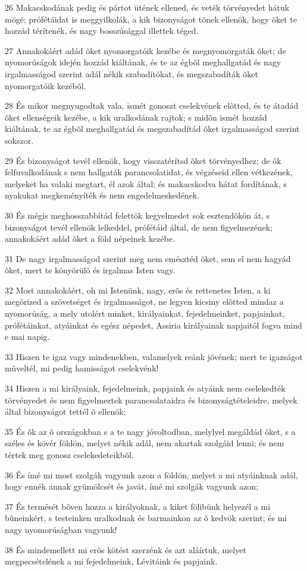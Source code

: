 \par 26 Makacskodának pedig és pártot ütének ellened, és veték törvényedet hátuk mögé; prófétáidat is meggyilkolák, a kik bizonyságot tõnek ellenök, hogy õket te hozzád térítenék, és nagy bosszúsággal illettek téged.
\par 27 Annakokáért adád õket nyomorgatóik kezébe és megnyomorgaták õket; de nyomorúságok idején hozzád kiáltának, és te az égbõl meghallgatád és nagy irgalmasságod szerint adál nékik szabadítókat, és megszabadíták õket nyomorgatóik kezébõl.
\par 28 És mikor megnyugodtak vala, ismét gonoszt cselekvének elõtted, és te átadád õket ellenségeik kezébe, a kik uralkodának rajtok; s midõn ismét hozzád kiáltának, te az égbõl meghallgatád és megszabadítád õket irgalmasságod szerint sokszor.
\par 29 És bizonyságot tevél ellenök, hogy visszatérítsd õket törvényedhez; de õk felfuvalkodának s nem hallgaták parancsolatidat, és végzéseid ellen vétkezének, melyeket ha valaki megtart, él azok által; és makacskodva hátat fordítának, s nyakukat megkeményíték és nem engedelmeskedének.
\par 30 És mégis meghosszabbítád felettök kegyelmedet sok esztendõkön át, s bizonyságot tevél ellenök lelkeddel, prófétáid által, de nem figyelmezének; annakokáért adád õket a föld népeinek kezébe.
\par 31 De nagy irgalmasságod szerint meg nem emésztéd õket, sem el nem hagyád õket, mert te könyörülõ és irgalmas Isten vagy.
\par 32 Most annakokáért, oh mi Istenünk, nagy, erõs és rettenetes Isten, a ki megõrized a szövetséget és irgalmasságot, ne legyen kicsiny elõtted mindaz a nyomorúság, a mely utolért minket, királyainkat, fejedelmeinket, papjainkat, prófétáinkat, atyáinkat és egész népedet, Assiria királyainak napjaitól fogva mind e mai napig.
\par 33 Hiszen te igaz vagy mindenekben, valamelyek reánk jövének; mert te igazságot mûveltél, mi pedig hamisságot cselekvénk!
\par 34 Hiszen a mi királyaink, fejedelmeink, papjaink és atyáink nem cselekedték törvényedet és nem figyelmeztek parancsolataidra és bizonyságtételeidre, melyek által bizonyságot tettél õ ellenök;
\par 35 És õk az õ országokban s a te nagy jóvoltodban, melylyel megáldád õket, s a széles és kövér földön, melyet nékik adál, nem akartak szolgáid lenni; és nem tértek meg gonosz cselekedeteikbõl.
\par 36 És ímé mi most szolgák vagyunk azon a földön, melyet a mi atyáinknak adál, hogy ennék annak gyümölcsét és javát, ímé mi szolgák vagyunk azon;
\par 37 És termését bõven hozza a királyoknak, a kiket fölibünk helyezél a mi bûneinkért, s testeinken uralkodnak és barmainkon az õ kedvök szerint; és mi nagy nyomorúságban vagyunk!
\par 38 És mindemellett mi erõs kötést szerzénk és azt aláírtuk, melyet megpecsételének a mi fejedelmeink, Lévitáink és papjaink.

